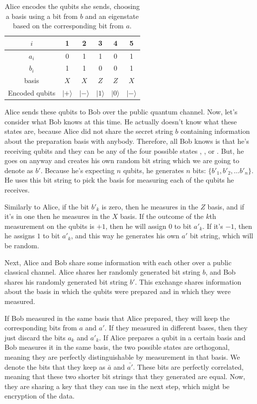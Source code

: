 \begin{table}
\centering
\begin{tabular}{|c||c|c|c|c|c|}
\hline $i$ & 1 & 2 & 3 & 4 & 5 \\
\hline $a_i$ & 0 & 1 & 1 & 0 & 1 \\
 $b_i$ & 1 & 1 & 0 & 0 & 1 \\
basis & $X$ & $X$ & $Z$ & $Z$ & $X$ \\
Encoded qubits & $|+\rangle$ & $|-\rangle$ & $|1\rangle$ & $|0\rangle$ & $|-\rangle$ \\
\hline
\end{tabular}
\caption[BB84 encoding example]{Alice encodes the qubits she sends, choosing a basis using a bit from $b$ and an eigenstate based on the corresponding bit from $a$.}
\label{tab:bb84-example}
\end{table}

Alice sends these qubits to Bob over the public quantum channel. Now, let's consider what Bob knows at this time. He actually doesn't know what these states are, because Alice did not share the secret string $b$ containing information about the preparation basis with anybody. Therefore, all Bob knows is that he's receiving qubits and they can be any of the four possible states , , \ket{+} or \ket{-}. But, he goes on anyway and creates his own random bit string which we are going to denote as $b'$. Because he's expecting $n$ qubits, he generates $n$ bits: $\{b'_1, b'_2, \ldots b'_n\}$.  He uses this bit string to pick the basis for measuring each of the qubits he receives.

Similarly to Alice, if the bit $b'_k$ is zero, then he measures in the $Z$ basis, and if it's in one then he measures in the $X$ basis. If the outcome of the $k$th measurement on the qubits is $+1$, then he will assign $0$ to bit $a'_k$. If it's $-1$, then he assigns $1$ to bit $a'_k$, and this way he generates his own $a'$ bit string, which will be random.

Next, Alice and Bob share some information with each other over a public classical channel. Alice shares her randomly generated bit string $b$, and Bob shares his randomly generated bit string $b'$.  This exchange shares information about the basis in which the qubits were prepared and in which they were measured.

If Bob measured in the same basis that Alice prepared, they will keep the corresponding bits from $a$ and $a'$. If they measured in different bases, then they just discard the bits $a_k$ and $a'_k$. If Alice prepares a qubit in a certain basis and Bob measures it in the same basis, the two possible states are orthogonal, meaning they are perfectly distinguishable by measurement in that basis.
We denote the bits that they keep as $\bar{a}$ and $\bar{a'}$. These bits are perfectly correlated, meaning that these two shorter bit strings that they generated are equal. Now, they are sharing a key that they can use in the next step, which might be encryption of the data.


